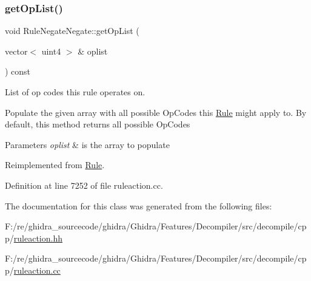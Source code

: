 \subsubsection{\texorpdfstring{getOpList()}{getOpList()}}
{\footnotesize\ttfamily void Rule\+Negate\+Negate\+::get\+Op\+List (\begin{DoxyParamCaption}\item[{vector$<$ uint4 $>$ \&}]{oplist }\end{DoxyParamCaption}) const\hspace{0.3cm}{\ttfamily [virtual]}}



List of op codes this rule operates on. 

Populate the given array with all possible Op\+Codes this \mbox{\hyperlink{class_rule}{Rule}} might apply to. By default, this method returns all possible Op\+Codes 
\begin{DoxyParams}{Parameters}
{\em oplist} & is the array to populate \\
\hline
\end{DoxyParams}


Reimplemented from \mbox{\hyperlink{class_rule_a4023bfc7825de0ab866790551856d10e}{Rule}}.



Definition at line 7252 of file ruleaction.\+cc.



The documentation for this class was generated from the following files\+:\begin{DoxyCompactItemize}
\item 
F\+:/re/ghidra\+\_\+sourcecode/ghidra/\+Ghidra/\+Features/\+Decompiler/src/decompile/cpp/\mbox{\hyperlink{ruleaction_8hh}{ruleaction.\+hh}}\item 
F\+:/re/ghidra\+\_\+sourcecode/ghidra/\+Ghidra/\+Features/\+Decompiler/src/decompile/cpp/\mbox{\hyperlink{ruleaction_8cc}{ruleaction.\+cc}}\end{DoxyCompactItemize}
